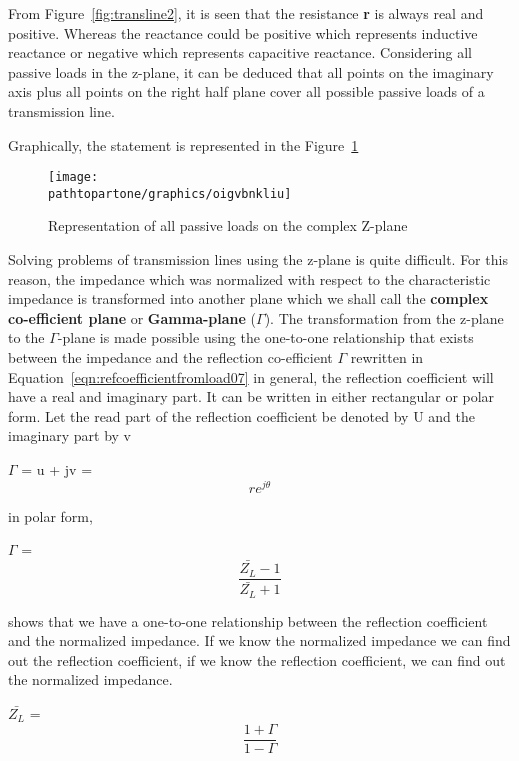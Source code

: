 From Figure~\ref{fig:transline2}, it is seen that the resistance \textbf{r} is always real and positive. Whereas the reactance could be positive which represents inductive reactance or negative which represents capacitive reactance. Considering all passive loads in the z-plane, it can be deduced that all points on the imaginary axis plus all points on the right half plane cover all possible passive loads of a transmission line.

Graphically, the statement is represented in the Figure~\ref{fig:oigvbnkliu}
\begin{figure}[h]
\centering
\texttt{[image: \\pathtopartone/graphics/oigvbnkliu]}
\caption{Representation of all passive loads on the complex Z-plane}
\label{fig:oigvbnkliu}
\end{figure}

Solving problems of transmission lines using the z-plane is quite difficult. For this reason, the impedance which was normalized with respect to the characteristic impedance is transformed into another plane which we shall call the \textbf{complex co-efficient plane} or \textbf{Gamma-plane} ($\Gamma$).
The transformation from the z-plane to the $\Gamma$-plane is made possible using the one-to-one relationship that exists between the impedance and the reflection co-efficient $\Gamma$ rewritten in  Equation~\eqref{eqn:refcoefficientfromload07}
in general, the reflection coefficient will have a real and imaginary part. It can be written in either rectangular or polar form. Let the read part of the reflection coefficient be denoted by U and the imaginary part by v

$\Gamma$ = u + jv = \[ re^{j\theta} \] 

in polar form,  

$\Gamma$ = \[ \frac{\bar{Z_L} - 1}{\bar{Z_L} + 1} \] 

shows that we have a one-to-one relationship between the reflection coefficient and the normalized impedance. If we know the normalized impedance we can find out the reflection coefficient, if we know the reflection coefficient, we can find out the normalized impedance.

$\bar{Z_L}$ = \[ \frac{1 + \Gamma}{1 - \Gamma} \] 

